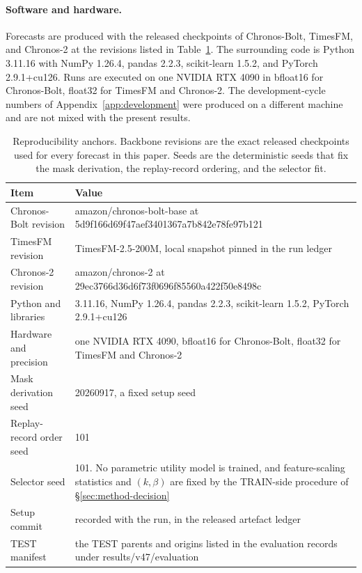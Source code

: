 \documentclass{article}
\begin{document}
\paragraph{Software and hardware.} Forecasts are produced with the released checkpoints of
Chronos-Bolt, TimesFM, and Chronos-2 at the revisions listed in Table~\ref{tab:app-repro}.
The surrounding code is Python 3.11.16 with NumPy 1.26.4, pandas
2.2.3, scikit-learn 1.5.2, and PyTorch 2.9.1+cu126. Runs are
executed on one NVIDIA RTX 4090 in bfloat16 for Chronos-Bolt, float32 for TimesFM and Chronos-2. The development-cycle numbers of
Appendix~\ref{app:development} were produced on a different machine and are not mixed with the
present results.

\begin{table}[!t]
  \caption{Reproducibility anchors. Backbone revisions are the exact released checkpoints used
  for every forecast in this paper. Seeds are the deterministic seeds that fix the mask
  derivation, the replay-record ordering, and the selector fit.}
  \label{tab:app-repro}
  \centering
  \small
  \setlength{\tabcolsep}{4pt}
  \begin{tabular}{@{}l p{}@{}}
    \toprule
    Item & Value \\
    \midrule
    Chronos-Bolt revision   & amazon/chronos-bolt-base at 5d9f166d69f47aef3401367a7b842e78fe97b121 \\
    TimesFM revision        & TimesFM-2.5-200M, local snapshot pinned in the run ledger \\
    Chronos-2 revision      & amazon/chronos-2 at 29ec3766d36d6f73f0696f85560a422f50e8498c \\
    Python and libraries    & 3.11.16, NumPy 1.26.4, pandas 2.2.3, scikit-learn 1.5.2, PyTorch 2.9.1+cu126 \\
    Hardware and precision  & one NVIDIA RTX 4090, bfloat16 for Chronos-Bolt, float32 for TimesFM and Chronos-2 \\
    Mask derivation seed    & 20260917, a fixed setup seed \\
    Replay-record order seed & 101 \\
    Selector seed             & 101. No parametric utility model is trained, and feature-scaling statistics and $(k,\beta)$ are fixed by the TRAIN-side procedure of \S\ref{sec:method-decision} \\
    Setup commit         & recorded with the run, in the released artefact ledger \\
    TEST manifest           & the TEST parents and origins listed in the evaluation records under results/v47/evaluation \\
    \bottomrule
  \end{tabular}
\end{table}
\end{document}
